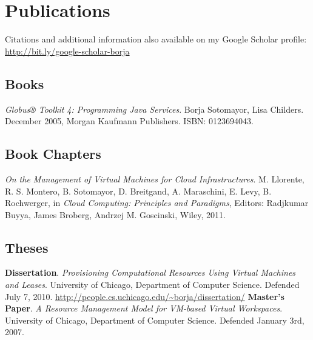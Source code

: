 \documentclass{resume}
\begin{document}
\section*{\hspace{-1cm}Publications}

Citations and additional information also available on my Google Scholar profile:\\ \url{http://bit.ly/google-scholar-borja}

\subsection*{Books}
\begin{category}{}
\citembullet \emph{Globus® Toolkit 4: Programming Java Services}. Borja Sotomayor, Lisa Childers. December 2005, Morgan Kaufmann Publishers. ISBN: 0123694043.
\end{category}

\subsection*{Book Chapters}
\begin{category}{}
\citembullet \emph{On the Management of Virtual Machines for Cloud Infrastructures}. M. Llorente, R. S. Montero, B. Sotomayor, D. Breitgand, A. Maraschini, E. Levy, B. Rochwerger, in \emph{Cloud Computing: Principles and Paradigms}, Editors: Radjkumar Buyya, James Broberg, Andrzej M. Goscinski, Wiley, 2011.
\end{category}

\subsection*{Theses}
\begin{category}{}
\citembullet \textbf{Dissertation}. \emph{Provisioning Computational Resources Using Virtual Machines and Leases}. University of Chicago, Department of Computer Science. Defended July 7, 2010. \url{http://people.cs.uchicago.edu/~borja/dissertation/}
\citembullet \textbf{Master's Paper}. \emph{A Resource Management Model for VM-based Virtual Workspaces}. University of Chicago, Department of Computer Science. Defended January 3rd, 2007.
\end{category}
\end{document}
